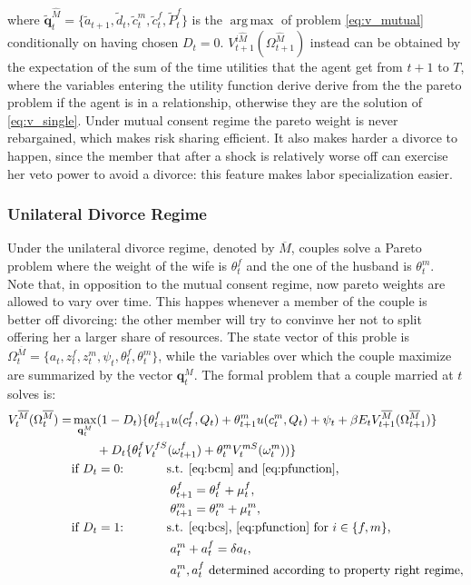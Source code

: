 \documentclass[12pt]{article}
\numberwithin{table}{section}
\DeclareMathOperator*{\argmax}{arg\,max}
\begin{document}
where $\mathbf{\tilde{q}}^{\hat{M}}_t=\{\tilde{a}_{t+1},\tilde{d}_{t},\tilde{c}^{m}_{t},\tilde{c}^{f}_{t},\tilde{P}^{f}_t\}$ is the $\argmax$ of problem \eqref{eq:v_mutual} conditionally on having chosen $D_t=0$. $V_{t+1}^{i\hat{M}}(\Omega^{\hat{M}}_{t+1})$ instead can be obtained by the expectation of the sum of the time utilities that the agent get from $t+1$ to $T$, where the variables entering the utility function derive derive from the the pareto problem if the agent is in a relationship, otherwise they are the solution of \eqref{eq:v_single}. Under mutual consent regime the pareto weight is never rebargained, which makes risk sharing efficient. It also makes harder a divorce to happen, since the member that after a shock is relatively worse off can exercise her veto power to avoid a divorce: this feature makes labor specialization easier.
\subsubsection*{Unilateral Divorce Regime}
Under the unilateral divorce regime, denoted by $\overline{M}$, couples solve a Pareto problem where the weight of the wife is $\theta^f_t$ and the one of the husband is $\theta^m_t$. Note that, in opposition to the mutual consent regime, now pareto weights are allowed to vary over time. This happes whenever a member of the couple is better off divorcing: the other member will try to convinve her not to split offering her a larger share of resources. The state vector of this proble is $\Omega^{\overline{M}}_t=\{a_t,z^f_t,z^m_t,\psi_t,\theta^f_t,\theta^m_t\}$, while the variables over which the couple maximize are summarized by the vector $\mathbf{q}^M_t$. The formal problem that a couple married at $t$ solves is:
\begin{equation}\label{eq:v_uni}
\begin{split}
V_t^{\overline{M}}(\Omega^{\overline{M}}_t)=&\max_{\mathbf{q}^M_t} (1-D_t)\{\theta^f_{t+1} u(c^f_t,Q_t)+\theta^m_{t+1} u(c^m_t,Q_t)+\psi_t+\beta E_t V^{\overline{M}}_{t+1}(\Omega^{\overline{M}}_{t+1})\}\\ &\quad\quad+D_t \{\theta^f_{t}V^{fS}_{t}(\omega^{f}_{t+1})+\theta^m_{t} V^{mS}_{t}(\omega^{m}_{t}))\}
\\ &\text{if $D_t=0$:}\hspace{35pt}\text{s.t. \eqref{eq:bcm} and \eqref{eq:pfunction},}\\ &\hspace{80pt}
\theta^f_{t+1}=\theta^f_{t}+\mu^f_t,\\ &\hspace{80pt}
\theta^m_{t+1}=\theta^m_{t}+\mu^m_t,
\\ &\text{if $D_t=1$:}\hspace{35pt}\text{s.t. \eqref{eq:bcs}, \eqref{eq:pfunction} for $i\in\{f,m\}$,}\\ &
\hspace{80pt}a_t^m+a_t^f=\delta a_t,	\\ &
\hspace{80pt}a_t^m,a_t^f\text{ determined according to property right regime},
\end{split}
\end{equation}
\end{document}
